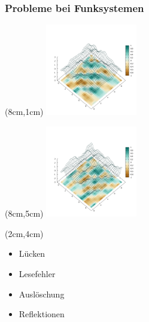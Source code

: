 \begin{frame} %
  	\frametitle{Probleme bei Funksystemen}
	\begin{textblock*}{4cm}(8cm,1cm) %
		\centering
  		\includegraphics[width=4cm]{../img/Plate0_A1.png}
  	\end{textblock*}
%  	
	\begin{textblock*}{4cm}(8cm,5cm) %
		\centering
  		\includegraphics[width=4cm]{../img/Plate0_A4.png}
  	\end{textblock*}
%  	
	\begin{textblock*}{4cm}(2cm,4cm) %
  			\begin{itemize}
  				\item Lücken
  				\item Lesefehler
   				\item Auslöschung
   				\item Reflektionen
  		  	\end{itemize}
  	\end{textblock*}
\end{frame}
